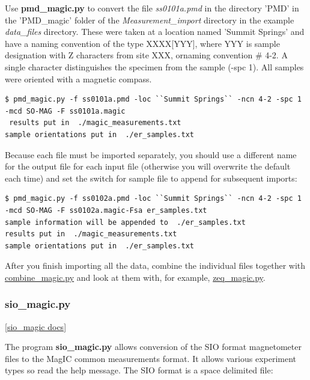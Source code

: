 \documentclass[11pt]{book}
\begin{document}
{{{{Use {\bf pmd\_magic.py} to convert the file {\it ss0101a.pmd} in the directory 'PMD' in the 'PMD\_magic' folder of the {\it Measurement\_import} directory in the example {\it data\_files } directory.  These were taken at a location named 'Summit Springs' and have a naming convention of the type XXXX[YYY], where  YYY is sample designation with Z characters from site XXX, ornaming convention \# 4-2.  A single character distinguishes the specimen from the sample (-spc 1).  All samples were oriented with a magnetic compass.

\begin{verbatim}
$ pmd_magic.py -f ss0101a.pmd -loc ``Summit Springs`` -ncn 4-2 -spc 1 -mcd SO-MAG -F ss0101a.magic
 results put in  ./magic_measurements.txt
sample orientations put in  ./er_samples.txt
\end{verbatim}

Because each file must be imported separately, you should use a different name for the output file for each input file (otherwise you will overwrite the default each time) and set the switch  for sample file to append for subsequent imports:

\begin{verbatim}
$ pmd_magic.py -f ss0102a.pmd -loc ``Summit Springs`` -ncn 4-2 -spc 1 -mcd SO-MAG -F ss0102a.magic-Fsa er_samples.txt
sample information will be appended to  ./er_samples.txt
results put in  ./magic_measurements.txt
sample orientations put in  ./er_samples.txt
\end{verbatim}
After you finish importing all the data, combine the individual files together with \href{#combine_magic.py}{combine\_magic.py} and look at them with, for example, \href{#zeq_magic.py}{zeq\_magic.py}.


\subsubsection {sio\_magic.py}
\href{https://github.com/PmagPy/PmagPy/blob/master/programs/sio_magic.py}{[sio\_magic docs]}


The program {\bf sio\_magic.py} allows conversion of the SIO format magnetometer files to the MagIC common measurements format.    It allows various experiment types so read the help message.    The SIO format is a space delimited file:


}}}}
\end{document}
